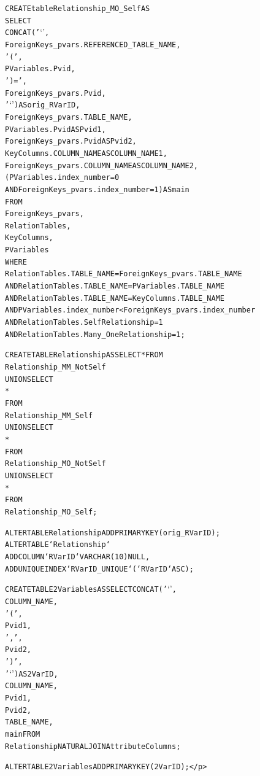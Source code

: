 \documentclass{IEEEtran}
\begin{document}
\begin{appendix}
\begin{scriptsize}
\begin{alltt}
CREATE table Relationship_MO_Self AS
SELECT 
    CONCAT('`',
            ForeignKeys_pvars.REFERENCED_TABLE_NAME,
            '(',
            PVariables.Pvid,
            ')=',
            ForeignKeys_pvars.Pvid,
            '`') AS orig_RVarID,
    ForeignKeys_pvars.TABLE_NAME,
    PVariables.Pvid AS Pvid1,
    ForeignKeys_pvars.Pvid AS Pvid2,
    KeyColumns.COLUMN_NAME AS COLUMN_NAME1,
    ForeignKeys_pvars.COLUMN_NAME AS COLUMN_NAME2,
    (PVariables.index_number = 0
        AND ForeignKeys_pvars.index_number = 1) AS main
FROM
    ForeignKeys_pvars,
    RelationTables,
    KeyColumns,
    PVariables
WHERE
    RelationTables.TABLE_NAME = ForeignKeys_pvars.TABLE_NAME
        AND RelationTables.TABLE_NAME = PVariables.TABLE_NAME
        AND RelationTables.TABLE_NAME = KeyColumns.TABLE_NAME
AND PVariables.index_number < ForeignKeys_pvars.index_number
        AND RelationTables.SelfRelationship = 1
        AND RelationTables.Many_OneRelationship = 1;

CREATE TABLE Relationship AS SELECT * FROM  
Relationship_MM_NotSelf    
UNION SELECT            
*                   
FROM
Relationship_MM_Self 
UNION SELECT 
*
FROM
Relationship_MO_NotSelf 
UNION SELECT 
*
FROM
Relationship_MO_Self;

ALTER TABLE Relationship ADD PRIMARY KEY (orig_RVarID);
ALTER TABLE `Relationship` 
ADD COLUMN `RVarID` VARCHAR(10) NULL , 
ADD UNIQUE INDEX `RVarID_UNIQUE` (`RVarID` ASC) ; 


CREATE TABLE 2Variables AS SELECT CONCAT('`',
        COLUMN_NAME,
        '(',
        Pvid1,
        ',',
        Pvid2,
        ')',
        '`') AS 2VarID,
COLUMN_NAME,
Pvid1,
Pvid2,
TABLE_NAME,
main FROM
Relationship    NATURAL JOIN  AttributeColumns;

ALTER TABLE 2Variables ADD PRIMARY KEY (2VarID);</p>\end{alltt}


\end{scriptsize}



\end{appendix}
\end{document}
